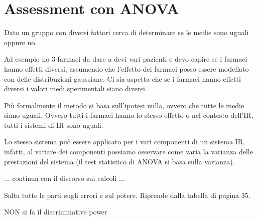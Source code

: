 
\section{Assessment con ANOVA}

Dato un gruppo con diversi fattori cerca di determinare se le medie sono uguali oppure no.

Ad esempio ho 3 farmaci da dare a devi vari pazienti e devo capire se i farmaci hanno effetti diversi, assumendo che l'effetto dei farmaci posso essere modellato con delle distribuzioni gaussiane.
Ci sia aspetta che se i farmaci hanno effetti diversi i valori medi sperimentali siano diversi.

Più formalmente il metodo si basa sull'ipotesi nulla, ovvero che tutte le medie siano uguali. Ovvero tutti i farmaci hanno lo stesso effetto o nel contesto dell'IR, tutti i sistemi di IR sono uguali.

Lo stesso sistema può essere applicato per i vari componenti di un sistema IR, infatti, al variare dei componenti possiamo osservare come varia la varianza delle prestazioni del sistema (il test statistico di ANOVA si basa sulla varianza).

... continua con il discorso sui calcoli ...

Salta tutte le parti sugli errori e sul potere. Riprende dalla tabella di pagina 35.

NON si fa il discriminative power
